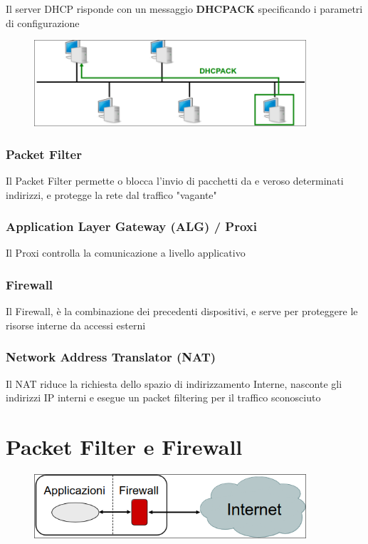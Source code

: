 \documentclass{report}
\begin{document}
                    Il server DHCP risponde con un messaggio \textbf{DHCPACK} specificando i parametri di configurazione
                    \begin{figure}[H]
                        \includegraphics[width=0.9\textwidth]{2/DHCP4.png}
                    \end{figure}
            \subsection{Packet Filter}
                Il Packet Filter permette o blocca l'invio di pacchetti da e veroso determinati indirizzi, e protegge la rete dal traffico "vagante"
            \subsection{Application Layer Gateway (ALG) / Proxi}
                Il Proxi controlla la comunicazione a livello applicativo
            \subsection{Firewall}
                Il Firewall, è la combinazione dei precedenti dispositivi, e serve per proteggere le risorse interne da accessi esterni
            \subsection{Network Address Translator (NAT)}
                Il NAT riduce la richiesta dello spazio di indirizzamento Interne, nasconte gli indirizzi IP interni e esegue un packet filtering per il traffico sconosciuto
    \chapter{Packet Filter e Firewall}
        \begin{figure}[H]
            \includegraphics[width=0.9\textwidth]{2/fir.png}
        \end{figure}
\end{document}
